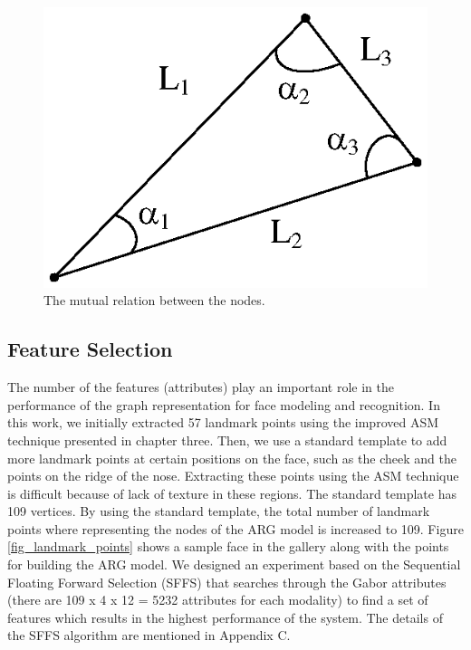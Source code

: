 \begin{figure}[tbp]
\begin{center}
\includegraphics[scale = 0.5]{./chapters/figures/mutual_rel.eps}
\caption{The mutual relation between the
nodes.}\label{fig_Mutual_ARG}
\end{center}
\end{figure}

\subsection{Feature Selection} The number of the features (attributes) play
an important role in the performance of the graph representation for
face modeling and recognition. In this work, we initially extracted
57 landmark points using the improved ASM technique presented in
chapter three. Then, we use a standard template to add more landmark
points at certain positions on the face, such as the cheek and the
points on the ridge of the nose. Extracting these points using the
ASM technique is difficult because of lack of texture in these
regions. The standard template has 109 vertices. By using the
standard template, the total number of landmark points where
representing the nodes of the ARG model is increased to 109. Figure
\ref{fig_landmark_points} shows a sample face in the gallery along
with the points for building the ARG model. We designed an
experiment based on the Sequential Floating Forward Selection (SFFS)
\cite{Pudil94} that searches through the Gabor attributes (there are
109 x 4 x 12 = 5232 attributes for each modality) to find a set of
features which results in the highest performance of the system. The
details of the SFFS algorithm are mentioned in Appendix C.

